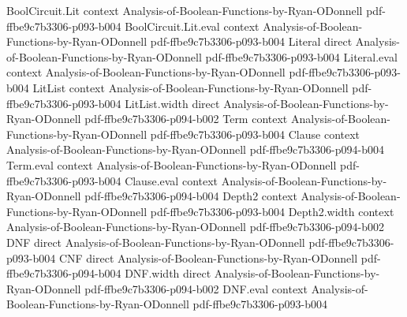 \begin{lemma}
\leanok
{}
\proofstep
  {BoolCircuit.Lit}
  {context}
  {Analysis-of-Boolean-Functions-by-Ryan-ODonnell}
  {pdf-ffbe9c7b3306-p093-b004}
\proofstep
  {BoolCircuit.Lit.eval}
  {context}
  {Analysis-of-Boolean-Functions-by-Ryan-ODonnell}
  {pdf-ffbe9c7b3306-p093-b004}
\proofstep
  {Literal}
  {direct}
  {Analysis-of-Boolean-Functions-by-Ryan-ODonnell}
  {pdf-ffbe9c7b3306-p093-b004}
\proofstep
  {Literal.eval}
  {context}
  {Analysis-of-Boolean-Functions-by-Ryan-ODonnell}
  {pdf-ffbe9c7b3306-p093-b004}
\proofstep
  {LitList}
  {context}
  {Analysis-of-Boolean-Functions-by-Ryan-ODonnell}
  {pdf-ffbe9c7b3306-p093-b004}
\proofstep
  {LitList.width}
  {direct}
  {Analysis-of-Boolean-Functions-by-Ryan-ODonnell}
  {pdf-ffbe9c7b3306-p094-b002}
\proofstep
  {Term}
  {context}
  {Analysis-of-Boolean-Functions-by-Ryan-ODonnell}
  {pdf-ffbe9c7b3306-p093-b004}
\proofstep
  {Clause}
  {context}
  {Analysis-of-Boolean-Functions-by-Ryan-ODonnell}
  {pdf-ffbe9c7b3306-p094-b004}
\proofstep
  {Term.eval}
  {context}
  {Analysis-of-Boolean-Functions-by-Ryan-ODonnell}
  {pdf-ffbe9c7b3306-p093-b004}
\proofstep
  {Clause.eval}
  {context}
  {Analysis-of-Boolean-Functions-by-Ryan-ODonnell}
  {pdf-ffbe9c7b3306-p094-b004}
\proofstep
  {Depth2}
  {context}
  {Analysis-of-Boolean-Functions-by-Ryan-ODonnell}
  {pdf-ffbe9c7b3306-p093-b004}
\proofstep
  {Depth2.width}
  {context}
  {Analysis-of-Boolean-Functions-by-Ryan-ODonnell}
  {pdf-ffbe9c7b3306-p094-b002}
\proofstep
  {DNF}
  {direct}
  {Analysis-of-Boolean-Functions-by-Ryan-ODonnell}
  {pdf-ffbe9c7b3306-p093-b004}
\proofstep
  {CNF}
  {direct}
  {Analysis-of-Boolean-Functions-by-Ryan-ODonnell}
  {pdf-ffbe9c7b3306-p094-b004}
\proofstep
  {DNF.width}
  {direct}
  {Analysis-of-Boolean-Functions-by-Ryan-ODonnell}
  {pdf-ffbe9c7b3306-p094-b002}
\proofstep
  {DNF.eval}
  {context}
  {Analysis-of-Boolean-Functions-by-Ryan-ODonnell}
  {pdf-ffbe9c7b3306-p093-b004}
\proofstep

\end{lemma}
